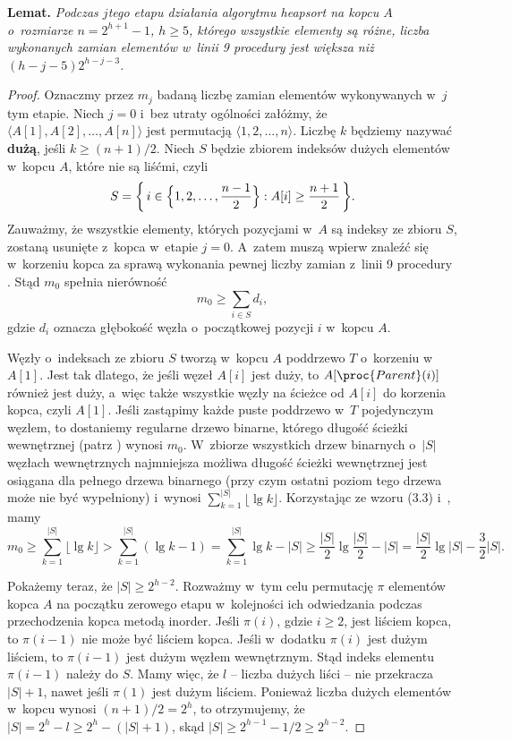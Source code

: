 \medskip
\noindent\textsf{\textbf{Lemat.}} \textit{Podczas\/ $j$\nbhyphen tego etapu działania algorytmu heapsort na kopcu\/ $A$ o~rozmiarze\/ $n=2^{h+1}-1$,\/ $h\ge5$, którego wszystkie elementy są różne, liczba wykonanych zamian elementów w~linii 9 procedury  jest większa niż\/ $(h-j-5)2^{h-j-3}$.}
\begin{proof}
Oznaczmy przez $m_j$ badaną liczbę zamian elementów wykonywanych w~$j$\nbhyphen tym etapie.
Niech $j=0$ i~bez utraty ogólności załóżmy, że $\langle A[1],A[2],\dots,A[n]\rangle$ jest permutacją $\langle1,2,\dots,n\rangle$.
Liczbę $k$ będziemy nazywać \textbf{dużą}, jeśli $k\ge(n+1)/2$.
Niech $S$ będzie zbiorem indeksów dużych elementów w~kopcu $A$, które nie są liśćmi, czyli
\[
    S = \biggl\{\,i\in\Bigl\{1,2,\dots,\frac{n-1}{2}\Bigr\}:A[i]\ge\frac{n+1}{2}\,\biggr\}.
\]
Zauważmy, że wszystkie elementy, których pozycjami w~$A$ są indeksy ze zbioru $S$, zostaną usunięte z~kopca w~etapie $j=0$.
A~zatem muszą wpierw znaleźć się w~korzeniu kopca za sprawą wykonania pewnej liczby zamian z~linii 9 procedury .
Stąd $m_0$ spełnia nierówność
\[
    m_0 \ge \sum_{i\in S}d_i,
\]
gdzie $d_i$ oznacza głębokość węzła o~początkowej pozycji $i$ w~kopcu $A$.

Węzły o~indeksach ze zbioru $S$ tworzą w~kopcu $A$ poddrzewo $T$ o~korzeniu w~$A[1]$.
Jest tak dlatego, że jeśli węzeł $A[i]$ jest duży, to $A[\proc{Parent}(i)]$ również jest duży, a~więc także wszystkie węzły na ścieżce od $A[i]$ do korzenia kopca, czyli $A[1]$.
Jeśli zastąpimy każde puste poddrzewo w~$T$ pojedynczym węzłem, to dostaniemy regularne drzewo binarne, którego długość ścieżki wewnętrznej (patrz ) wynosi $m_0$.
W~zbiorze wszystkich drzew binarnych o~$|S|$ węzłach wewnętrznych najmniejsza możliwa długość ścieżki wewnętrznej jest osiągana dla pełnego drzewa binarnego (przy czym ostatni poziom tego drzewa może nie być wypełniony) i~wynosi $\sum_{k=1}^{|S|}\lfloor\lg k\rfloor$.
Korzystając ze wzoru (3.3) i~, mamy
\[
    m_0 \ge \sum_{k=1}^{|S|}\lfloor\lg k\rfloor > \sum_{k=1}^{|S|}(\lg k-1) = \sum_{k=1}^{|S|}\lg k-|S| \ge \frac{|S|}{2}\lg\frac{|S|}{2}-|S| = \frac{|S|}{2}\lg|S|-\frac{3}{2}|S|.
\]

Pokażemy teraz, że $|S|\ge2^{h-2}$.
Rozważmy w~tym celu permutację $\pi$ elementów kopca $A$ na początku zerowego etapu w~kolejności ich odwiedzania podczas przechodzenia kopca metodą inorder.
Jeśli $\pi(i)$, gdzie $i\ge2$, jest liściem kopca, to $\pi(i-1)$ nie może być liściem kopca.
Jeśli w~dodatku $\pi(i)$ jest dużym liściem, to $\pi(i-1)$ jest dużym węzłem wewnętrznym.
Stąd indeks elementu $\pi(i-1)$ należy do $S$.
Mamy więc, że $l$ -- liczba dużych liści -- nie przekracza $|S|+1$, nawet jeśli $\pi(1)$ jest dużym liściem.
Ponieważ liczba dużych elementów w~kopcu wynosi $(n+1)/2=2^h$, to otrzymujemy, że $|S|=2^h-l\ge2^h-(|S|+1)$, skąd $|S|\ge2^{h-1}-1/2\ge2^{h-2}$.


\end{proof}
